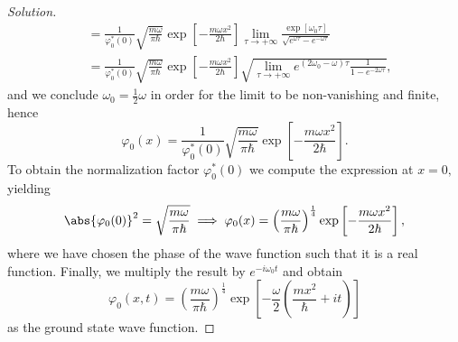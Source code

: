\begin{proof}[Solution]
\begin{align*}
                   &= \frac{1}{\varphi_0^*(0)}\sqrt{\frac{m \omega}{\pi \hbar}} \exp\left[-\frac{m \omega x^2}{2\hbar}\right] \lim_{\tau \to +\infty}{\frac{\exp\left[\omega_0 \tau\right]}{\sqrt{e^{\omega \tau} - e^{-\omega \tau}}}}\\
                   &= \frac{1}{\varphi_0^*(0)}\sqrt{\frac{m \omega}{\pi \hbar}} \exp\left[-\frac{m \omega x^2}{2\hbar}\right] \sqrt{\lim_{\tau \to +\infty}{e^{(2 \omega_0 - \omega)\tau}\frac{1}{1 - e^{-2\omega \tau}}}},
   \end{align*}
   and we conclude \(\omega_0 = \frac12 \omega\) in order for the limit to be non-vanishing and finite, hence
   \begin{equation*}
      \varphi_0(x) = \frac{1}{\varphi_0^*(0)} \sqrt{\frac{m \omega}{\pi \hbar}} \exp\left[-\frac{m\omega x^2}{2 \hbar}\right].
   \end{equation*}
   To obtain the normalization factor \(\varphi_0^*(0)\) we compute the expression at \(x = 0,\) yielding
   \begin{equation*}
      \abs{\varphi_0(0)}^2 = \sqrt{\frac{m \omega}{\pi \hbar}} \implies \varphi_0(x) = \left(\frac{m \omega}{\pi \hbar}\right)^{\frac14} \exp\left[- \frac{m \omega x^2}{2 \hbar}\right],
   \end{equation*}
   where we have chosen the phase of the wave function such that it is a real function. Finally, we multiply the result by \(e^{-i \omega_0 t}\) and obtain
   \begin{equation*}
   \varphi_0(x, t) = \left(\frac{m \omega}{\pi \hbar}\right)^{\frac14} \exp\left[-\frac{\omega}{2}\left(\frac{m x^2}{\hbar} + i t\right)\right]
   \end{equation*}
   as the ground state wave function.
\end{proof}
